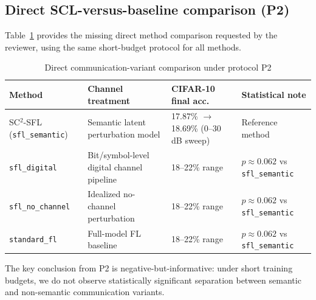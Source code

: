 \documentclass[10pt,journal]{IEEEtran}
\begin{document}
\subsection{Direct SCL-versus-baseline comparison (P2)}
Table~\ref{tab:direct_baselines_p2} provides the missing direct method comparison requested by the reviewer, using the same short-budget protocol for all methods.
\begin{table}[htbp]
\centering
\caption{Direct communication-variant comparison under protocol P2}
\label{tab:direct_baselines_p2}
\footnotesize
\setlength{\tabcolsep}{3.5pt}
\begin{tabular}{p{}p{}p{}p{}}
\toprule
\textbf{Method} & \textbf{Channel treatment} & \textbf{CIFAR-10 final acc.} & \textbf{Statistical note} \\
\midrule
SC$^2$-SFL (\texttt{sfl\_semantic}) & Semantic latent perturbation model & 17.87\% $\rightarrow$ 18.69\% (0--30 dB sweep) & Reference method \\
\texttt{sfl\_digital} & Bit/symbol-level digital channel pipeline & 18--22\% range & $p\approx0.062$ vs \texttt{sfl\_semantic} \\
\texttt{sfl\_no\_channel} & Idealized no-channel perturbation & 18--22\% range & $p\approx0.062$ vs \texttt{sfl\_semantic} \\
\texttt{standard\_fl} & Full-model FL baseline & 18--22\% range & $p\approx0.062$ vs \texttt{sfl\_semantic} \\
\bottomrule
\end{tabular}
\end{table}
The key conclusion from P2 is negative-but-informative: under short training budgets, we do not observe statistically significant separation between semantic and non-semantic communication variants.
\end{document}
